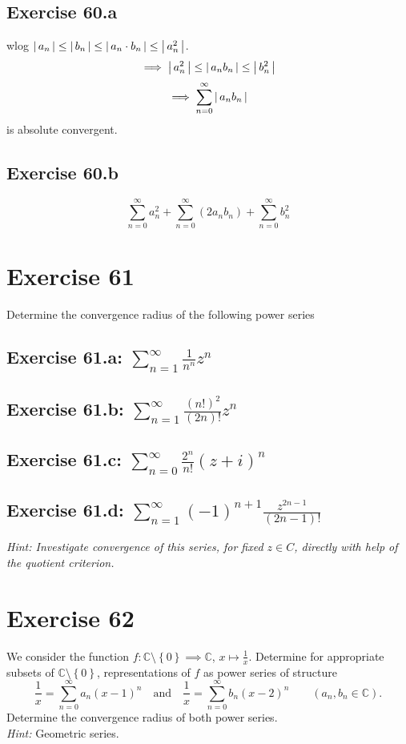 \documentclass[a4paper]{article}
\theoremstyle{definition}
\newcommand\abs[1]{\left|\thinspace #1\thinspace\right|}
\newcommand\set[1]{\left\{#1\right\}}
\begin{document}
\subsection{Exercise 60.a}
wlog $\abs{a_n} \leq \abs{b_n} \leq \abs{a_n \cdot b_n} \leq \abs{a_n^2}$.
\[ \implies \abs{a_n^2} \leq \abs{a_n b_n} \leq \abs{b_n^2} \]
\[ \implies \sum_{n=0}^\infty \abs{a_n b_n} \]
is absolute convergent.

\subsection{Exercise 60.b}
\[ \sum_{n=0}^\infty a_n^2 + \sum_{n=0}^\infty (2 a_n b_n) + \sum_{n=0}^\infty b_n^2 \]

\section{Exercise 61}
\begin{ex}
  Determine the convergence radius of the following power series
\end{ex}

\subsection{Exercise 61.a: $\sum_{n=1}^\infty \frac1{n^n} z^n$}
\subsection{Exercise 61.b: $\sum_{n=1}^\infty \frac{(n!)^2}{(2n)!} z^n$}
\subsection{Exercise 61.c: $\sum_{n=0}^\infty \frac{2^n}{n!} (z + i)^n$}
\subsection{Exercise 61.d: $\sum_{n=1}^\infty (-1)^{n+1} \frac{z^{2n-1}}{(2n - 1)!}$}
\emph{Hint: Investigate convergence of this series, for fixed $z \in C$, directly with help of the quotient criterion.}

\section{Exercise 62}
\begin{ex}
  We consider the function $f: \mathbb C \setminus \set{0} \implies \mathbb C$, $x \mapsto \frac1x$.
  Determine for appropriate subsets of $\mathbb C \setminus \set{0}$, representations of $f$ as power series of structure
  \[
    \frac1x = \sum_{n=0}^\infty a_n (x - 1)^n
    \quad\text{and}\quad
    \frac1x = \sum_{n=0}^\infty b_n (x-2)^n
    \qquad (a_n, b_n \in \mathbb C).
  \]
  Determine the convergence radius of both power series. \\
  \emph{Hint:} Geometric series.
\end{ex}
\end{document}
